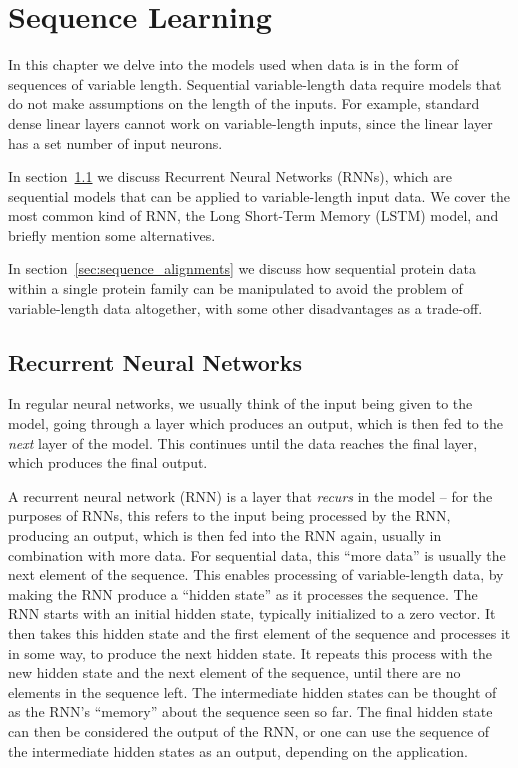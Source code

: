 \chapter{Sequence Learning}
In this chapter we delve into the models used when data is in the form of sequences of variable length. Sequential variable-length data require models that do not make assumptions on the length of the inputs. For example, standard dense linear layers cannot work on variable-length inputs, since the linear layer has a set number of input neurons.

In section~\ref{sec:recurrent_neural_networks} we discuss Recurrent Neural Networks (RNNs), which are sequential models that can be applied to variable-length input data. We cover the most common kind of RNN, the Long Short-Term Memory (LSTM) model, and briefly mention some alternatives.

In section~\ref{sec:sequence_alignments} we discuss how sequential protein data  within a single protein family can be manipulated to avoid the problem of variable-length data altogether, with some other disadvantages as a trade-off.


\section{Recurrent Neural Networks}
\label{sec:recurrent_neural_networks}
In regular neural networks, we usually think of the input being given to the model, going through a layer which produces an output, which is then fed to the \textit{next} layer of the model. This continues until the data reaches the final layer, which produces the final output.

A recurrent neural network (RNN) is a layer that \textit{recurs} in the model -- for the purposes of RNNs, this refers to the input being processed by the RNN, producing an output, which is then fed into the RNN again, usually in combination with more data. For sequential data, this ``more data'' is usually the next element of the sequence. This enables processing of variable-length data, by making the RNN produce a ``hidden state'' as it processes the sequence. The RNN starts with an initial hidden state, typically initialized to a zero vector. It then takes this hidden state and the first element of the sequence and processes it in some way, to produce the next hidden state. It repeats this process with the new hidden state and the next element of the sequence, until there are no elements in the sequence left. The intermediate hidden states can be thought of as the RNN's ``memory'' about the sequence seen so far. The final hidden state can then be considered the output of the RNN, or one can use the sequence of the intermediate hidden states as an output, depending on the application.

